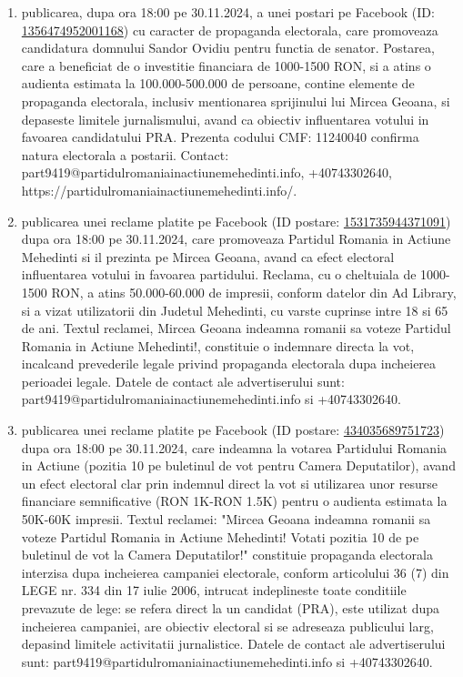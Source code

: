 \documentclass[a4paper,12pt]{article}
\begin{document}
\begin{enumerate}[leftmargin=*, label=\arabic*.)]
    \item publicarea, dupa ora 18:00 pe 30.11.2024, a unei postari pe Facebook (ID: \href{https://www.facebook.com/ads/library/?id=1356474952001168}{1356474952001168}) cu caracter de propaganda electorala, care promoveaza candidatura domnului Sandor Ovidiu pentru functia de senator. Postarea, care a beneficiat de o investitie financiara de 1000-1500 RON,  si a atins o audienta estimata la 100.000-500.000 de persoane,  contine elemente de propaganda electorala, inclusiv mentionarea sprijinului lui Mircea Geoana,  si depaseste limitele jurnalismului, avand ca obiectiv influentarea votului in favoarea candidatului PRA.  Prezenta codului CMF: 11240040 confirma natura electorala a postarii.  Contact: part9419@partidulromaniainactiunemehedinti.info, +40743302640, https://partidulromaniainactiunemehedinti.info/.
    \item publicarea unei reclame platite pe Facebook (ID postare: \href{https://www.facebook.com/ads/library/?id=1531735944371091}{1531735944371091}) dupa ora 18:00 pe 30.11.2024, care promoveaza Partidul Romania in Actiune Mehedinti si il prezinta pe Mircea Geoana, avand ca efect electoral influentarea votului in favoarea partidului.  Reclama, cu o cheltuiala de 1000-1500 RON, a atins 50.000-60.000 de impresii, conform datelor din Ad Library, si a vizat utilizatorii din Judetul Mehedinti, cu varste cuprinse intre 18 si 65 de ani.  Textul reclamei, Mircea Geoana indeamna romanii sa voteze Partidul Romania in Actiune Mehedinti!, constituie o indemnare directa la vot, incalcand prevederile legale privind propaganda electorala dupa incheierea perioadei legale.  Datele de contact ale advertiserului sunt: part9419@partidulromaniainactiunemehedinti.info si +40743302640.
    \item publicarea unei reclame platite pe Facebook (ID postare: \href{https://www.facebook.com/ads/library/?id=434035689751723}{434035689751723}) dupa ora 18:00 pe 30.11.2024, care indeamna la votarea Partidului Romania in Actiune (pozitia 10 pe buletinul de vot pentru Camera Deputatilor), avand un efect electoral clar prin indemnul direct la vot si utilizarea unor resurse financiare semnificative (RON 1K-RON 1.5K) pentru o audienta estimata la 50K-60K impresii.  Textul reclamei: "Mircea Geoana indeamna romanii sa voteze Partidul Romania in Actiune Mehedinti! Votati pozitia 10 de pe buletinul de vot la Camera Deputatilor!" constituie propaganda electorala interzisa dupa incheierea campaniei electorale, conform articolului 36 (7) din LEGE nr. 334 din 17 iulie 2006, intrucat indeplineste toate conditiile prevazute de lege: se refera direct la un candidat (PRA), este utilizat dupa incheierea campaniei, are obiectiv electoral si se adreseaza publicului larg, depasind limitele activitatii jurnalistice.  Datele de contact ale advertiserului sunt: part9419@partidulromaniainactiunemehedinti.info si +40743302640.

\end{enumerate}
\end{document}
